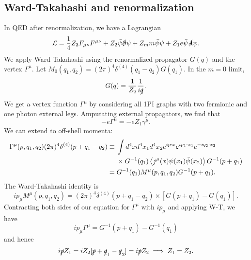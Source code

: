\subsection*{Ward-Takahashi and renormalization}
In QED after renormalization, we have a Lagrangian
\begin{equation}
     \cL =\frac{1}{4} Z_3 F_{\mu\nu} F^{\mu\nu} + Z_2 \bar \psi \slashed{\p} \psi +Z_m m \bar \psi \psi +Z_1 e \bar \psi \slashed{A} \psi.
\end{equation}
We apply Ward-Takahashi using the renormalized propagator $G(q)$ and the vertex $\Gamma^\mu$. Let $M_0(q_1,q_2)=(2\pi)^4 \delta^{(4)}(q_1-q_2) G(q_1)$. In the $m=0$ limit,
\begin{equation}
    G(q) =\frac{1}{Z_2} \frac{1}{i\slashed{q}}.
\end{equation}
We get a vertex function $\Gamma^\mu$ by considering all 1PI graphs with two fermionic and one photon external legs. Amputating external propagators, we find that
\begin{equation}
    -e \Gamma^\mu = -e Z_1 \gamma^\mu.
\end{equation}
We can extend to off-shell momenta:
\begin{align*}
    \Gamma^\mu(p,q_1,q_2) (2\pi)^4 \delta^{(4)}(p+q_1 -q_2) \equiv{}& \int d^4x d^4 x_1 d^4 x_2 e^{ip\cdot x} e^{ip_1 \cdot x_1} e^{-iq_2 \cdot x_2} \\
    &\times G^{-1}(q_1) \left< j^\mu(x) \psi(x_1) \bar \psi(x_2) \right> G^{-1}(p+q_1)\\
        ={}& G^{-1}(q_1) M^\mu(p,q_1,q_2) G^{-1}(p+q_1).
\end{align*}
The Ward-Takahashi identity is
\begin{equation}
    ip_\mu M^\mu(p,q_1,q_2) =(2\pi)^4 \delta^{(4)}(p+q_1-q_2) \times [G(p+q_1)-G(q_1)].
\end{equation}
Contracting both sides of our equation for $\Gamma^\mu$ with $ip_\mu$ and applying W-T, we have
\begin{equation}
    ip_\mu \Gamma^\mu = G^{-1}(p+q_1) -G^{-1}(q_1)
\end{equation}
and hence
\begin{equation}
    i\slashed{p} Z_1 = iZ_2 [\slashed{p} + \slashed{q}_1 - \slashed{q}_2] = i\slashed{p} Z_2 \implies Z_1=Z_2.
\end{equation}